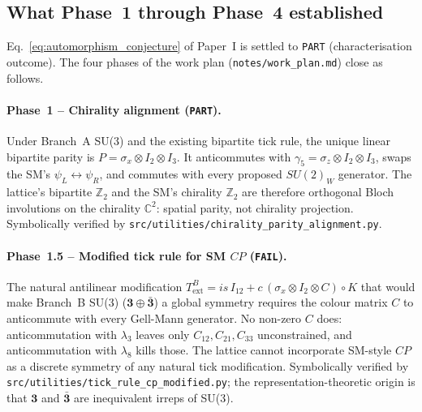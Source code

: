%

\label{sec:conclusion}

\subsection{What Phase~1 through Phase~4 established}
\label{subsec:results_summary}

Eq.~\eqref{eq:automorphism_conjecture} of Paper~I is settled to
\texttt{PART} (characterisation outcome).  The four phases of the
work plan (\nolinkurl{notes/work_plan.md}) close as follows.

\paragraph{Phase~1 -- Chirality alignment (\texttt{PART}).}  Under
Branch~A SU(3) and the existing bipartite tick rule, the unique
linear bipartite parity is $P = \sigma_x \otimes I_2 \otimes I_3$.
It anticommutes with $\gamma_5 = \sigma_z \otimes I_2 \otimes I_3$,
swaps the SM's $\psi_L \leftrightarrow \psi_R$, and commutes with
every proposed $SU(2)_W$ generator.  The lattice's bipartite
$\mathbb{Z}_2$ and the SM's chirality $\mathbb{Z}_2$ are therefore
orthogonal Bloch involutions on the chirality $\mathbb{C}^2$:
spatial parity, not chirality projection.  Symbolically verified
by \nolinkurl{src/utilities/chirality_parity_alignment.py}.

\paragraph{Phase~1.5 -- Modified tick rule for SM $CP$ (\texttt{FAIL}).}
The natural antilinear modification
$T_\text{ext}^B = is\,I_{12} + c\,(\sigma_x \otimes I_2 \otimes C) \circ K$
that would make Branch~B SU(3) ($\mathbf{3} \oplus \bar{\mathbf{3}}$) a
global symmetry requires the colour matrix $C$ to anticommute with
every Gell-Mann generator.  No non-zero $C$ does: anticommutation
with $\lambda_3$ leaves only $C_{12}, C_{21}, C_{33}$ unconstrained,
and anticommutation with $\lambda_8$ kills those.  The lattice
cannot incorporate SM-style $CP$ as a discrete symmetry of any
natural tick modification.  Symbolically verified by
\nolinkurl{src/utilities/tick_rule_cp_modified.py}; the
representation-theoretic origin is that $\mathbf{3}$ and
$\bar{\mathbf{3}}$ are inequivalent irreps of SU(3).

